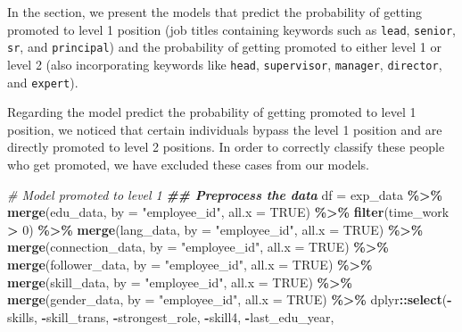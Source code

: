 \documentclass[11pt,]{article}
\newenvironment{Shaded}{\begin{snugshade}}{\end{snugshade}}
\newcommand{\AttributeTok}[1]{\textcolor[rgb]{0.13,0.29,0.53}{#1}}
\newcommand{\CommentTok}[1]{\textcolor[rgb]{0.56,0.35,0.01}{\textit{#1}}}
\newcommand{\ConstantTok}[1]{\textcolor[rgb]{0.56,0.35,0.01}{#1}}
\newcommand{\DecValTok}[1]{\textcolor[rgb]{0.00,0.00,0.81}{#1}}
\newcommand{\DocumentationTok}[1]{\textcolor[rgb]{0.56,0.35,0.01}{\textbf{\textit{#1}}}}
\newcommand{\FunctionTok}[1]{\textcolor[rgb]{0.13,0.29,0.53}{\textbf{#1}}}
\newcommand{\NormalTok}[1]{#1}
\newcommand{\OtherTok}[1]{\textcolor[rgb]{0.56,0.35,0.01}{#1}}
\newcommand{\SpecialCharTok}[1]{\textcolor[rgb]{0.81,0.36,0.00}{\textbf{#1}}}
\newcommand{\StringTok}[1]{\textcolor[rgb]{0.31,0.60,0.02}{#1}}
\begin{document}
In the section, we present the models that predict the probability of
getting promoted to level 1 position (job titles containing keywords
such as \texttt{lead}, \texttt{senior}, \texttt{sr}, and
\texttt{principal}) and the probability of getting promoted to either
level 1 or level 2 (also incorporating keywords like \texttt{head},
\texttt{supervisor}, \texttt{manager}, \texttt{director}, and
\texttt{expert}).

Regarding the model predict the probability of getting promoted to level
1 position, we noticed that certain individuals bypass the level 1
position and are directly promoted to level 2 positions. In order to
correctly classify these people who get promoted, we have excluded these
cases from our models.

\begin{Shaded}
\begin{Highlighting}[]
\CommentTok{\# Model promoted to level 1}
\DocumentationTok{\#\# Preprocess the data}
\NormalTok{df }\OtherTok{=}\NormalTok{ exp\_data }\SpecialCharTok{\%\textgreater{}\%}
  \FunctionTok{merge}\NormalTok{(edu\_data, }\AttributeTok{by =} \StringTok{"employee\_id"}\NormalTok{, }\AttributeTok{all.x =} \ConstantTok{TRUE}\NormalTok{) }\SpecialCharTok{\%\textgreater{}\%}
  \FunctionTok{filter}\NormalTok{(time\_work }\SpecialCharTok{\textgreater{}} \DecValTok{0}\NormalTok{) }\SpecialCharTok{\%\textgreater{}\%} 
  \FunctionTok{merge}\NormalTok{(lang\_data, }\AttributeTok{by =} \StringTok{"employee\_id"}\NormalTok{, }\AttributeTok{all.x =} \ConstantTok{TRUE}\NormalTok{) }\SpecialCharTok{\%\textgreater{}\%}
  \FunctionTok{merge}\NormalTok{(connection\_data, }\AttributeTok{by =} \StringTok{"employee\_id"}\NormalTok{, }\AttributeTok{all.x =} \ConstantTok{TRUE}\NormalTok{) }\SpecialCharTok{\%\textgreater{}\%}
  \FunctionTok{merge}\NormalTok{(follower\_data, }\AttributeTok{by =} \StringTok{"employee\_id"}\NormalTok{, }\AttributeTok{all.x =} \ConstantTok{TRUE}\NormalTok{) }\SpecialCharTok{\%\textgreater{}\%}
  \FunctionTok{merge}\NormalTok{(skill\_data, }\AttributeTok{by =} \StringTok{"employee\_id"}\NormalTok{, }\AttributeTok{all.x =} \ConstantTok{TRUE}\NormalTok{) }\SpecialCharTok{\%\textgreater{}\%} 
  \FunctionTok{merge}\NormalTok{(gender\_data, }\AttributeTok{by =} \StringTok{"employee\_id"}\NormalTok{, }\AttributeTok{all.x =} \ConstantTok{TRUE}\NormalTok{) }\SpecialCharTok{\%\textgreater{}\%} 
\NormalTok{  dplyr}\SpecialCharTok{::}\FunctionTok{select}\NormalTok{(}\SpecialCharTok{{-}}\NormalTok{skills, }\SpecialCharTok{{-}}\NormalTok{skill\_trans, }\SpecialCharTok{{-}}\NormalTok{strongest\_role, }\SpecialCharTok{{-}}\NormalTok{skill4, }\SpecialCharTok{{-}}\NormalTok{last\_edu\_year,}

\end{Highlighting}
\end{Shaded}
\end{document}

